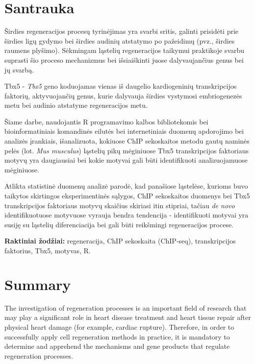\documentclass[12pt]{article}
\begin{document}
\section*{Santrauka}
Širdies regeneracijos procesų tyrinėjimas yra svarbi sritis, galinti
prisidėti prie širdies ligų gydymo bei širdies audinių atstatymo po
pažeidimų (pvz., širdies raumens plyšimo). Sėkmingam ląstelių regeneracijos
taikymui praktikoje svarbu suprasti šio proceso mechanizmus bei išsiaiškinti
juose dalyvaujančius genus bei jų svarbą.

Tbx5 - \emph{Tbx5} geno koduojamas vienas iš daugelio kardiogeninių
transkripcijos faktorių, aktyvuojančių genus, kurie dalyvauja širdies
vystymosi embriogenezės metu bei audinio atstatyme regeneracijos metu.
                                                                                     
Šiame darbe, naudojantis R programavimo kalbos bibliotekomis bei
bioinformatiniais komandinės eilutės bei internetiniais duomenų apdorojimo
bei analizės įrankiais, išanalizuota, kokiuose ChIP sekoskaitos metodu gautų
naminės pelės (lot. \emph{Mus musculus}) ląstelių pikų mėginiuose Tbx5
transkripcijos faktoriaus motyvų yra daugiausiai bei kokie motyvai gali būti
identifikuoti analizuojamuose mėginiuose.

Atlikta statistinė duomenų analizė parodė, kad panašiose ląstelėse,
kurioms buvo taikytos skirtingos eksperimentinės sąlygos, ChIP sekoskaitos
duomenys bei Tbx5 transkripcijos faktoriaus motyvų skaičius skiriasi itin
stipriai, tačiau \emph{de novo} identifikuotuose motyvuose vyrauja bendra
tendencija - identifikuoti motyvai yra susiję su ląstelių diferenciacija
bei gali būti reikšmingi regeneracijos procese.

\hfill \break
\textbf{Raktiniai žodžiai:} regeneracija, ChIP sekoskaita (ChIP-seq),
    transkripcijos faktorius, Tbx5, motyvas, R.
\newpage


\section*{Summary}
The investigation of regeneration processes is an important field of research
that may play a significant role in heart disease treatment and heart tissue
repair after physical heart damage (for example, cardiac rupture).
Therefore, in order to successfully apply cell regeneration methods in practice,
it is mandatory to determine and apprehend the mechanisms and gene
products that regulate regeneration processes.
\end{document}
